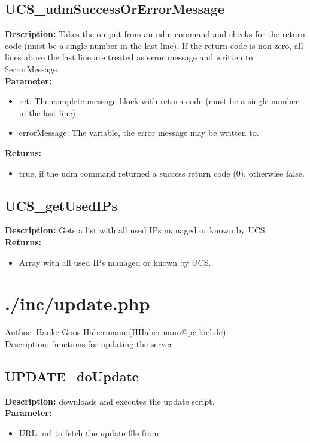 \subsection{UCS\_udmSuccessOrErrorMessage}
\textbf{Description:} Takes the output from an udm command and checks for the return code (must be a single number in the last line). If the return code is non-zero, all lines above the last line are treated as error message and written to \$errorMessage.\\
\textbf{Parameter:}
\begin{itemize}
\item ret: The complete message block with return code (must be a single number in the last line)
\item errorMessage: The variable, the error message may be written to.
\end{itemize}
\textbf{Returns:}
\begin{itemize}
\item true, if the udm command returned a success return code (0), otherwise false.
\end{itemize}

\subsection{UCS\_getUsedIPs}
\textbf{Description:} Gets a list with all used IPs managed or known by UCS.\\
\textbf{Returns:}
\begin{itemize}
\item Array with all used IPs managed or known by UCS.
\end{itemize}

\newpage\section{./inc/update.php}
 Author: Hauke Goos-Habermann (HHabermann@pc-kiel.de)\\
 Description: functions for updating the server\\

\subsection{UPDATE\_doUpdate}
\textbf{Description:} downloads and executes the update script.\\
\textbf{Parameter:}
\begin{itemize}
\item URL: url to fetch the update file from
\end{itemize}

